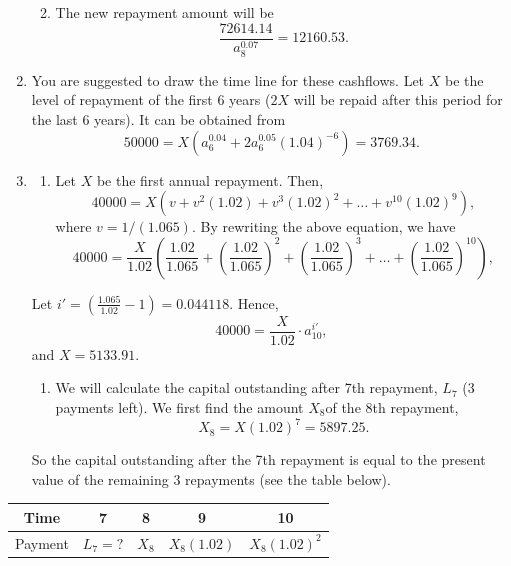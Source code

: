 \documentclass[
]{book}
\providecommand{\tightlist}{%
  \setlength{\itemsep}{0pt}\setlength{\parskip}{0pt}}
\theoremstyle{definition}
\theoremstyle{definition}
\theoremstyle{definition}
\theoremstyle{definition}
\theoremstyle{remark}
\begin{document}
\begin{enumerate}
  \begin{enumerate}
  \def\labelenumii{\arabic{enumii}.}
  \setcounter{enumii}{2}
  \tightlist
  \item
    The new repayment amount will be
    \[\frac{72614.14}{a^{0.07}_{8}} = 12160.53.\]
  \end{enumerate}
\item
  You are suggested to draw the time line for these cashflows. Let \(X\) be the level of repayment of the first 6 years (\(2X\) will be repaid after this period for the last 6 years). It can be obtained from
  \[ 50000 = X(a^{0.04}_6 + 2 a^{0.05}_6 (1.04)^{-6}) = 3769.34.\]
\item
  \begin{enumerate}
  \def\labelenumii{\arabic{enumii}.}
  \tightlist
  \item
    Let \(X\) be the first annual repayment. Then,\\
    \[ 40000 = X(v + v^2(1.02) + v^3(1.02)^2 + \ldots + v^{10}(1.02)^9),\]
    where \(v = 1/(1.065).\) By rewriting the above equation, we have
    \[ 40000 = \frac{X}{1.02}(\frac{1.02}{1.065} + \left( \frac{1.02}{1.065} \right)^2 + \left( \frac{1.02}{1.065} \right)^3 + \ldots + \left( \frac{1.02}{1.065} \right)^{10}),\]
  \end{enumerate}

  Let \(i' =  \left( \frac{1.065}{1.02} -1 \right) = 0.044118.\) Hence,
  \[ 40000 = \frac{X}{1.02} \cdot a^{i'}_{10},\]
  and \(X = 5133.91.\)

  \begin{enumerate}
  \def\labelenumii{\arabic{enumii}.}
  \setcounter{enumii}{1}
  \tightlist
  \item
    We will calculate the capital outstanding after 7th repayment, \(L_7\) (3 payments left). We first find the amount \(X_8\)of the 8th repayment,
    \[X_8 = X(1.02)^7 = 5897.25.\]
  \end{enumerate}

  So the capital outstanding after the 7th repayment is equal to the present value of the remaining 3 repayments (see the table below).
\end{enumerate}

\begin{longtable}[]{@{}ccccc@{}}
\toprule\noalign{}
Time & 7 & 8 & 9 & 10 \\
\midrule\noalign{}
\endhead
\bottomrule\noalign{}
\endlastfoot
Payment & \(L_7 = ?\) & \(X_8\) & \(X_8 (1.02)\) & \(X_8(1.02)^2\) \\
\end{longtable}
\end{document}
